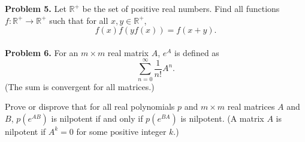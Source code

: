 \documentclass{article}
\begin{document}
\textbf{Problem 5.}
Let \( \mathbb{R}^+ \) be the set of positive real numbers. Find all functions \( f : \mathbb{R}^+ \to \mathbb{R}^+ \) such that for all \( x, y \in \mathbb{R}^+ \),
\[
f(x) f(y f(x)) = f(x + y).
\]
\\

\textbf{Problem 6.}
For an \( m \times m \) real matrix \( A \), \( e^A \) is defined as
\[
\sum_{n=0}^{\infty} \frac{1}{n!} A^n.
\]
(The sum is convergent for all matrices.)

Prove or disprove that for all real polynomials \( p \) and \( m \times m \) real matrices \( A \) and \( B \), \( p(e^{AB}) \) is nilpotent if and only if \( p(e^{BA}) \) is nilpotent. (A matrix \( A \) is nilpotent if \( A^k = 0 \) for some positive integer \( k \).)
\end{document}
